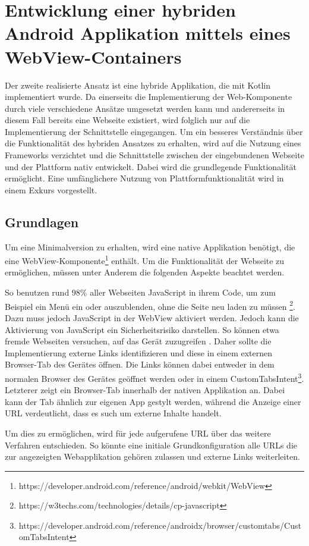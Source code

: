 \section{Entwicklung einer hybriden Android Applikation mittels eines WebView-Containers}
Der zweite realisierte Ansatz ist eine hybride Applikation, die mit Kotlin implementiert wurde. 
Da einerseits die Implementierung der Web-Komponente durch viele verschiedene Ansätze umgesetzt werden kann und andererseits in diesem Fall bereits eine Webseite existiert, wird folglich nur auf die Implementierung der Schnittstelle eingegangen. 
Um ein besseres Verständnis über die Funktionalität des hybriden Ansatzes zu erhalten, wird auf die Nutzung eines Frameworks verzichtet und die Schnittstelle zwischen der eingebundenen Webseite und der Plattform nativ entwickelt.
Dabei wird die grundlegende Funktionalität ermöglicht. Eine umfänglichere Nutzung von Plattformfunktionalität wird in einem Exkurs vorgestellt.

\subsection{Grundlagen}
Um eine Minimalversion zu erhalten, wird eine native Applikation benötigt, die eine WebView-Komponente\footnote{https://developer.android.com/reference/android/webkit/WebView} enthält. Um die Funktionalität der Webseite zu ermöglichen, müssen unter Anderem die folgenden Aspekte beachtet werden.

So benutzen rund 98\% aller Webseiten JavaScript in ihrem Code, um zum Beispiel ein Menü ein oder auszublenden, ohne die Seite neu laden zu müssen \footnote{https://w3techs.com/technologies/details/cp-javascript}. 
Dazu muss jedoch JavaScript in der WebView aktiviert werden. 
Jedoch kann die Aktivierung von JavaScript ein Sicherheitsrisiko darstellen. So können etwa fremde Webseiten versuchen, auf das Gerät zuzugreifen \cite{webview_javascript_security}. 
Daher sollte die Implementierung externe Links identifizieren und diese in einem externen Browser-Tab des Gerätes öffnen.
Die Links können dabei entweder in dem normalen Browser des Gerätes geöffnet werden oder in einem CustomTabsIntent\footnote{https://developer.android.com/reference/androidx/browser/customtabs/CustomTabsIntent}.
Letzterer zeigt ein Browser-Tab innerhalb der nativen Applikation an. Dabei kann der Tab ähnlich zur eigenen App gestylt werden, während die Anzeige einer URL verdeutlicht, dass es such um externe Inhalte handelt.

Um dies zu ermöglichen, wird für jede aufgerufene URL über das weitere Verfahren entschieden. So könnte eine initiale Grundkonfiguration alle URLs die zur angezeigten Webapplikation gehören zulassen und externe Links weiterleiten.

